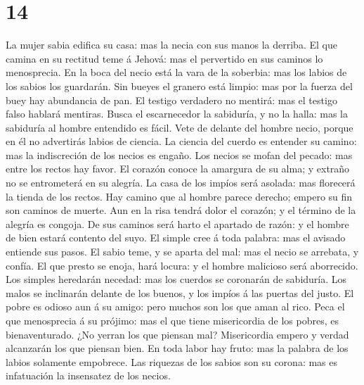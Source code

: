 \hypertarget{section-13}{%
\section{14}\label{section-13}}

 La mujer sabia edifica su casa: mas la necia con sus
manos la derriba.  El que camina en su rectitud teme á
Jehová: mas el pervertido en sus caminos lo menosprecia. 
En la boca del necio está la vara de la soberbia: mas los labios de los
sabios los guardarán.  Sin bueyes el granero está limpio:
mas por la fuerza del buey hay abundancia de pan.  El
testigo verdadero no mentirá: mas el testigo falso hablará mentiras.
 Busca el escarnecedor la sabiduría, y no la halla: mas la
sabiduría al hombre entendido es fácil.  Vete de delante
del hombre necio, porque en él no advertirás labios de ciencia.
 La ciencia del cuerdo es entender su camino: mas la
indiscreción de los necios es engaño.  Los necios se mofan
del pecado: mas entre los rectos hay favor.  El corazón
conoce la amargura de su alma; y extraño no se entrometerá en su
alegría.  La casa de los impíos será asolada: mas
florecerá la tienda de los rectos.  Hay camino que al
hombre parece derecho; empero su fin son caminos de muerte.
 Aun en la risa tendrá dolor el corazón; y el término de
la alegría es congoja.  De sus caminos será harto el
apartado de razón: y el hombre de bien estará contento del suyo.
 El simple cree á toda palabra: mas el avisado entiende
sus pasos.  El sabio teme, y se aparta del mal: mas el
necio se arrebata, y confía.  El que presto se enoja,
hará locura: y el hombre malicioso será aborrecido.  Los
simples heredarán necedad: mas los cuerdos se coronarán de sabiduría.
 Los malos se inclinarán delante de los buenos, y los
impíos á las puertas del justo.  El pobre es odioso aun á
su amigo: pero muchos son los que aman al rico.  Peca el
que menosprecia á su prójimo: mas el que tiene misericordia de los
pobres, es bienaventurado.  ¿No yerran los que piensan
mal? Misericordia empero y verdad alcanzarán los que piensan bien.
 En toda labor hay fruto: mas la palabra de los labios
solamente empobrece.  Las riquezas de los sabios son su
corona: mas es infatuación la insensatez de los necios. 
